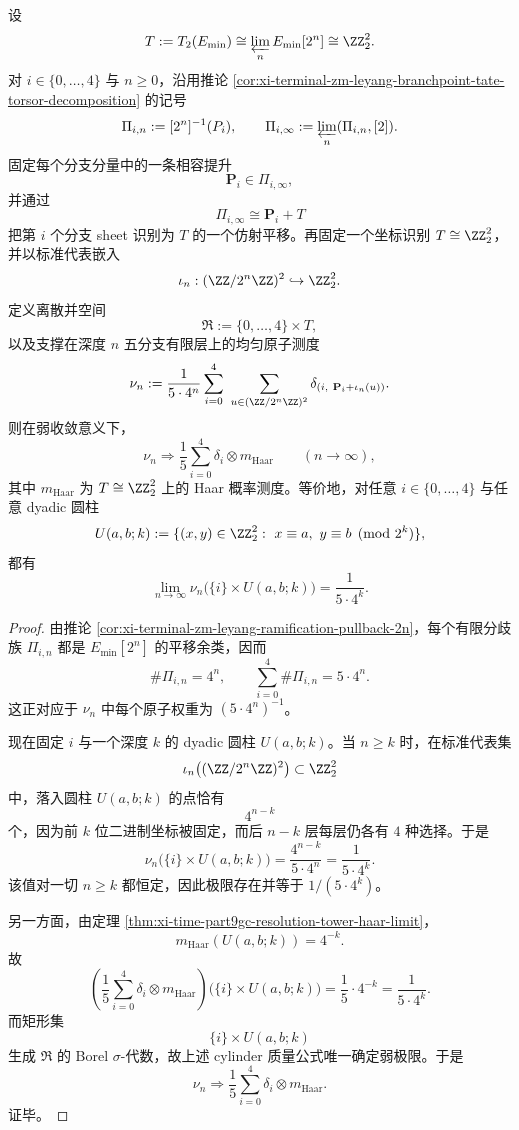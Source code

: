 \begin{theorem}\label{thm:conclusion-leyang-five-branch-haar-boundary-limit}
设
\[
T:=T_2(E_{\min})\cong \varprojlim_n E_{\min}[2^n]\cong \ZZ_2^2.
\]
对 \(i\in\{0,\dots,4\}\) 与 \(n\ge 0\)，沿用推论 \ref{cor:xi-terminal-zm-leyang-branchpoint-tate-torsor-decomposition} 的记号
\[
\Pi_{i,n}:=[2^n]^{-1}(P_i),
\qquad
\Pi_{i,\infty}:=\varprojlim_n(\Pi_{i,n},[2]).
\]
固定每个分支分量中的一条相容提升
\[
\mathbf P_i\in \Pi_{i,\infty},
\]
并通过
\[
\Pi_{i,\infty}\cong \mathbf P_i+T
\]
把第 \(i\) 个分支 sheet 识别为 \(T\) 的一个仿射平移。再固定一个坐标识别 \(T\cong \ZZ_2^2\)，并以标准代表嵌入
\[
\iota_n:(\ZZ/2^n\ZZ)^2\hookrightarrow \ZZ_2^2.
\]
定义离散并空间
\[
\mathfrak R:=\{0,\dots,4\}\times T,
\]
以及支撑在深度 \(n\) 五分支有限层上的均匀原子测度
\[
\nu_n:=
\frac{1}{5\cdot 4^n}
\sum_{i=0}^{4}\ \sum_{u\in(\ZZ/2^n\ZZ)^2}
\delta_{(i,\ \mathbf P_i+\iota_n(u))}.
\]
则在弱收敛意义下，
\[
\boxed{\;
\nu_n\Longrightarrow
\frac15\sum_{i=0}^{4}\delta_i\otimes m_{\mathrm{Haar}}
\qquad(n\to\infty),\;}
\]
其中 \(m_{\mathrm{Haar}}\) 为 \(T\cong \ZZ_2^2\) 上的 Haar 概率测度。等价地，对任意 \(i\in\{0,\dots,4\}\) 与任意 dyadic 圆柱
\[
U(a,b;k):=
\{(x,y)\in \ZZ_2^2:\ x\equiv a,\ y\equiv b\pmod{2^k}\},
\]
都有
\[
\boxed{\;
\lim_{n\to\infty}\nu_n\bigl(\{i\}\times U(a,b;k)\bigr)=\frac{1}{5\cdot 4^k}.\;}
\]
\end{theorem}
\begin{proof}
由推论 \ref{cor:xi-terminal-zm-leyang-ramification-pullback-2n}，每个有限分歧族 \(\Pi_{i,n}\) 都是 \(E_{\min}[2^n]\) 的平移余类，因而
\[
\#\Pi_{i,n}=4^n,
\qquad
\sum_{i=0}^{4}\#\Pi_{i,n}=5\cdot 4^n.
\]
这正对应于 \(\nu_n\) 中每个原子权重为 \((5\cdot 4^n)^{-1}\)。

现在固定 \(i\) 与一个深度 \(k\) 的 dyadic 圆柱 \(U(a,b;k)\)。当 \(n\ge k\) 时，在标准代表集
\[
\iota_n\bigl((\ZZ/2^n\ZZ)^2\bigr)\subset \ZZ_2^2
\]
中，落入圆柱 \(U(a,b;k)\) 的点恰有
\[
4^{n-k}
\]
个，因为前 \(k\) 位二进制坐标被固定，而后 \(n-k\) 层每层仍各有 \(4\) 种选择。于是
\[
\nu_n\bigl(\{i\}\times U(a,b;k)\bigr)
=
\frac{4^{n-k}}{5\cdot 4^n}
=
\frac{1}{5\cdot 4^k}.
\]
该值对一切 \(n\ge k\) 都恒定，因此极限存在并等于 \(1/(5\cdot4^k)\)。

另一方面，由定理 \ref{thm:xi-time-part9gc-resolution-tower-haar-limit}，
\[
m_{\mathrm{Haar}}(U(a,b;k))=4^{-k}.
\]
故
\[
\left(\frac15\sum_{i=0}^{4}\delta_i\otimes m_{\mathrm{Haar}}\right)
\bigl(\{i\}\times U(a,b;k)\bigr)
=
\frac15\cdot 4^{-k}
=
\frac{1}{5\cdot 4^k}.
\]
而矩形集
\[
\{i\}\times U(a,b;k)
\]
生成 \(\mathfrak R\) 的 Borel \(\sigma\)-代数，故上述 cylinder 质量公式唯一确定弱极限。于是
\[
\nu_n\Longrightarrow \frac15\sum_{i=0}^{4}\delta_i\otimes m_{\mathrm{Haar}}.
\]
证毕。
\end{proof}

